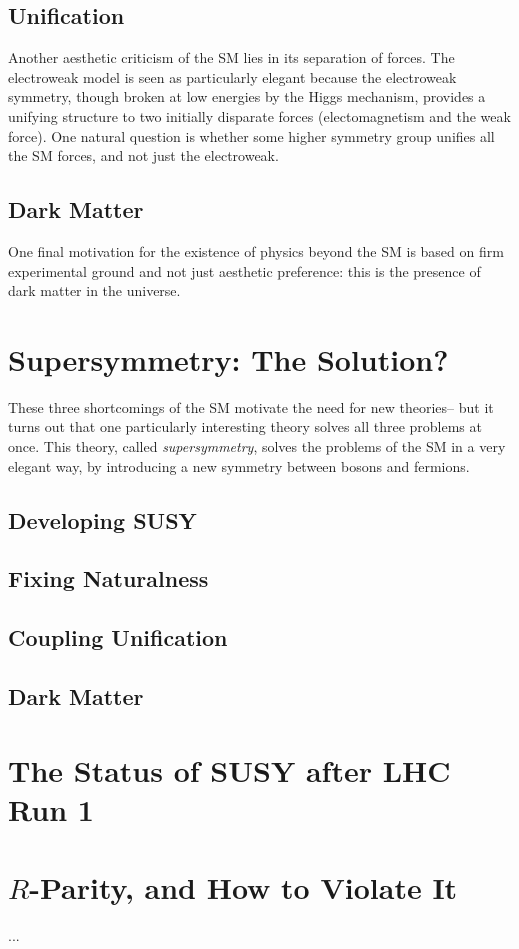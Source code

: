 \subsection{Unification}

Another aesthetic criticism of the SM lies in its separation of forces. The electroweak model is seen as particularly elegant because the electroweak symmetry, though broken at low energies by the Higgs mechanism, provides a unifying structure to two initially disparate forces (electomagnetism and the weak force). One natural question is whether some higher symmetry group unifies all the SM forces, and not just the electroweak. 


\subsection{Dark Matter}

One final motivation for the existence of physics beyond the SM is based on firm experimental ground and not just aesthetic preference: this is the presence of dark matter in the universe. 

\section{Supersymmetry: The Solution?}

These three shortcomings of the SM motivate the need for new theories-- but it turns out that one particularly interesting theory solves all three problems at once. This theory, called \textit{supersymmetry}, solves the problems of the SM in a very elegant way, by introducing a new symmetry between bosons and fermions. 

\subsection{Developing SUSY} 

\subsection{Fixing Naturalness}

\subsection{Coupling Unification}

\subsection{Dark Matter}

\section{The Status of SUSY after LHC Run 1}


\section{$R$-Parity, and How to Violate It}

		 ...